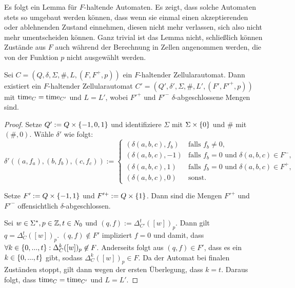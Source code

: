 Es folgt ein Lemma für $F$-haltende Automaten. Es zeigt, dass solche Automaten stets so umgebaut werden können,
dass wenn sie einmal einen akzeptierenden oder ablehnenden Zustand einnehmen, diesen nicht mehr verlassen, sich also nicht mehr umentscheiden können.
Ganz trivial ist das Lemma nicht, schließlich können Zustände aus $F$ auch während der Berechnung in Zellen angenommen werden,
die von der Funktion $p$ nicht ausgewählt werden.

\begin{lemma}
    \label{lemmaAbgeschlosseneMenge}
    
    Sei $C = (Q, \delta, \Sigma, \#, L, (F, F^+, p))$ ein $F$-haltender Zellularautomat.
    Dann existiert ein $F$-haltender Zellularautomat $C' = (Q', \delta', \Sigma, \#, L', (F', F'^+, p))$ mit $\operatorname{time}_{C} = \operatorname{time}_{C'}$ und $L = L'$,
    wobei $F'^+$ und $F'^-$ $\delta$-abgeschlossene Mengen sind.
\end{lemma}
\begin{proof}
    Setze $Q' := Q \times \{ {{-1}, 0, 1} \}$ und identifiziere $\Sigma$ mit $\Sigma \times \{ {0} \}$ und $\#$ mit $(\#, 0)$.
    Wähle $\delta'$ wie folgt:
    \[
       \delta'((a, f_a), (b, f_b), (c, f_c)) :=
       \begin{cases}
         (\delta(a, b, c), f_b)  & \text{falls } f_b \neq 0, \\
         (\delta(a, b, c), {-1}) & \text{falls } f_b = 0 \text{ und } \delta(a, b, c) \in F^-, \\
         (\delta(a, b, c), {1}) & \text{falls } f_b = 0 \text{ und }  \delta(a, b, c) \in F^+, \\
         (\delta(a, b, c), {0}) & \text{sonst.}
       \end{cases}
    \]
    
    Setze $F' := Q \times \{ {{-1}, 1} \}$ und $F'^+ := Q \times \{ {1} \}$.
    Dann sind die Mengen $F'^+$ und $F'^-$ offensichtlich $\delta$-abgeschlossen.
    
    Sei $w \in \Sigma^*, p \in \mathbb{Z}, t \in N_0$ und $(q, f) := \Delta_{C'}^t([w])_p$.
    Dann gilt $q = \Delta_{C}^t([w])_p$. $(q, f) \not\in F'$ impliziert $f = 0$ und damit, dass $\forall k \in \{ { 0, ..., t } \}: \Delta_{C}^k([w])_p \not\in F$.
    Anderseits folgt aus $(q, f) \in F'$, dass es ein $k \in \{ {0, ...,  t} \}$ gibt, sodass $\Delta_{C}^k([w])_p \in F$.
    Da der Automat bei finalen Zuständen stoppt, gilt dann wegen der ersten Überlegung, dass $k = t$.
    Daraus folgt, dass $\operatorname{time}_{C} = \operatorname{time}_{C'}$ und $L = L'$.
\end{proof}


